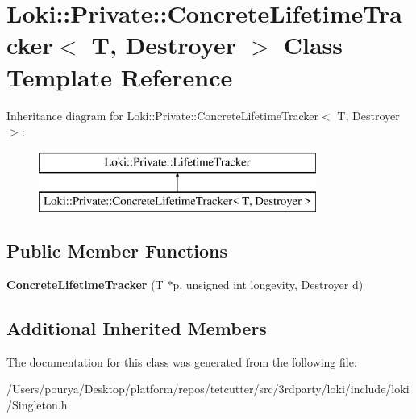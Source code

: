 \hypertarget{classLoki_1_1Private_1_1ConcreteLifetimeTracker}{}\section{Loki\+:\+:Private\+:\+:Concrete\+Lifetime\+Tracker$<$ T, Destroyer $>$ Class Template Reference}
\label{classLoki_1_1Private_1_1ConcreteLifetimeTracker}
Inheritance diagram for Loki\+:\+:Private\+:\+:Concrete\+Lifetime\+Tracker$<$ T, Destroyer $>$\+:\begin{figure}[H]
\begin{center}
\leavevmode
\includegraphics[height=2.000000cm]{classLoki_1_1Private_1_1ConcreteLifetimeTracker}
\end{center}
\end{figure}
\subsection*{Public Member Functions}
\begin{DoxyCompactItemize}
\item 
\hypertarget{classLoki_1_1Private_1_1ConcreteLifetimeTracker_a02bebf5a01c041538e4c67c81ea163ca}{}{\bfseries Concrete\+Lifetime\+Tracker} (T $\ast$p, unsigned int longevity, Destroyer d)\label{classLoki_1_1Private_1_1ConcreteLifetimeTracker_a02bebf5a01c041538e4c67c81ea163ca}

\end{DoxyCompactItemize}
\subsection*{Additional Inherited Members}


The documentation for this class was generated from the following file\+:\begin{DoxyCompactItemize}
\item 
/\+Users/pourya/\+Desktop/platform/repos/tetcutter/src/3rdparty/loki/include/loki/Singleton.\+h\end{DoxyCompactItemize}
